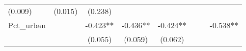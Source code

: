 \documentclass[12pt,twoside]{reedthesis}
\begin{document}
\begin{longtable}[]{@{}lccccccc@{}}
\begin{minipage}[t]{0.10\columnwidth}
  (0.009)\strut
  \end{minipage} & \begin{minipage}[t]{0.10\columnwidth}\centering\strut
  (0.015)\strut
  \end{minipage} & \begin{minipage}[t]{0.10\columnwidth}\centering\strut
  (0.238)\strut
  \end{minipage}\tabularnewline
  \begin{minipage}[t]{0.12\columnwidth}\raggedright\strut
  Pct\_urban\strut
  \end{minipage} & \begin{minipage}[t]{0.09\columnwidth}\centering\strut
  \strut
  \end{minipage} & \begin{minipage}[t]{0.10\columnwidth}\centering\strut
  -0.423**\strut
  \end{minipage} & \begin{minipage}[t]{0.10\columnwidth}\centering\strut
  -0.436**\strut
  \end{minipage} & \begin{minipage}[t]{0.10\columnwidth}\centering\strut
  -0.424**\strut
  \end{minipage} & \begin{minipage}[t]{0.10\columnwidth}\centering\strut
  \strut
  \end{minipage} & \begin{minipage}[t]{0.10\columnwidth}\centering\strut
  \strut
  \end{minipage} & \begin{minipage}[t]{0.10\columnwidth}\centering\strut
  -0.538**\strut
  \end{minipage}\tabularnewline
  \begin{minipage}[t]{0.12\columnwidth}\raggedright\strut
  \strut
  \end{minipage} & \begin{minipage}[t]{0.09\columnwidth}\centering\strut
  \strut
  \end{minipage} & \begin{minipage}[t]{0.10\columnwidth}\centering\strut
  (0.055)\strut
  \end{minipage} & \begin{minipage}[t]{0.10\columnwidth}\centering\strut
  (0.059)\strut
  \end{minipage} & \begin{minipage}[t]{0.10\columnwidth}\centering\strut
  (0.062)\strut
  \end{minipage} & \begin{minipage}[t]{0.10\columnwidth}\centering\strut

\end{minipage}
\end{longtable}
\end{document}
